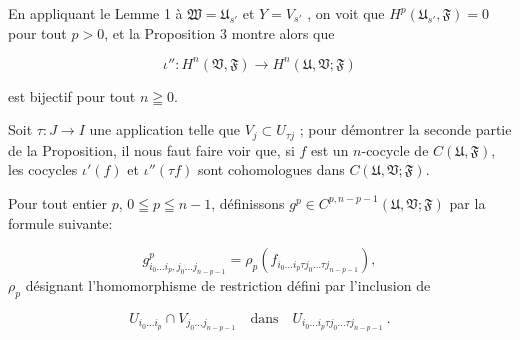 En appliquant le Lemme 1 à $\mathfrak{W} = \mathfrak{U}_{s'}$ et $Y = V_{s'}$ , on voit que $H^p(\mathfrak{U}_{s'} , \mathfrak{F}) = 0$ pour tout $p > 0$, et la Proposition 3 montre alors que

\begin{equation*}
\iota'' : H^n(\mathfrak{V}, \mathfrak{F}) \longrightarrow H^n(\mathfrak{U}, \mathfrak{V}; \mathfrak{F})
\end{equation*}

est bijectif pour tout $n \geqq 0$.

Soit $\tau: J \rightarrow I$ une application telle que $V_j \subset U_{\tau j}$ ; pour démontrer la seconde partie de la Proposition, il nous faut faire voir que, si $f$ est un $n$-cocycle de $C(\mathfrak{U}, \mathfrak{F})$, les cocycles $\iota'(f)$ et $\iota''(\tau f)$ sont cohomologues dans $C(\mathfrak{U}, \mathfrak{V}; \mathfrak{F})$.



%
%
%
%
Pour tout entier $p$, $0 \leqq p \leqq n - 1$, définissons $g^p \in C^{p, n-p-1}(\mathfrak{U}, \mathfrak{V}; \mathfrak{F})$ par la formule suivante:

\begin{equation*}
g^p_{i_0 \ldots i_p , j_0 \ldots j_{n-p-1}} = \rho_p(f_{i_0 \ldots i_p \tau j_0 \ldots \tau j_{n-p-1}}),
\end{equation*}
$\rho_p$ désignant l'homomorphisme de restriction défini par l'inclusion de

\begin{equation*}
U_{i_0 \ldots i_p} \cap V_{j_0 \ldots j_{n-p-1}} \quad \text{dans} \quad U_{i_0 \ldots i_p \tau j_0 \ldots \tau j_{n-p-1}} \ .
\end{equation*}

